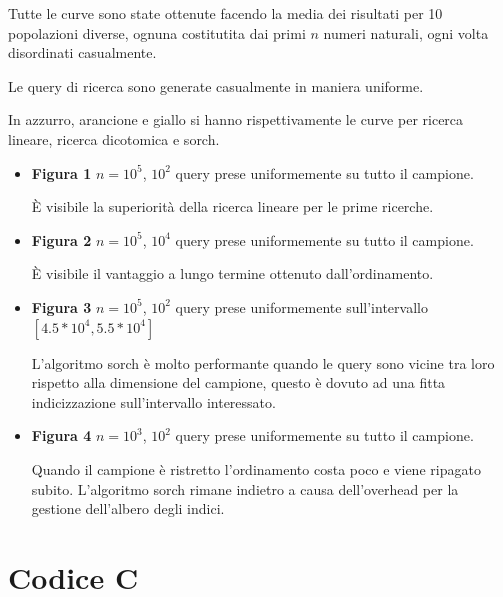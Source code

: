 \documentclass{article}
\begin{document}
    Tutte le curve sono state ottenute facendo la media dei risultati per 10
    popolazioni diverse, ognuna costitutita dai primi $n$ numeri naturali,
    ogni volta disordinati casualmente.

    Le query di ricerca sono generate casualmente in maniera uniforme.

    In azzurro, arancione e giallo si hanno rispettivamente le curve per ricerca
    lineare, ricerca dicotomica e sorch.

    \begin{itemize}
      \item \textbf{Figura 1} $n = 10^5$, $10^2$ query prese uniformemente su
        tutto il campione.

        È visibile la superiorità della ricerca lineare per le prime ricerche.

      \item \textbf{Figura 2} $n = 10^5$, $10^4$ query prese uniformemente su
        tutto il campione.

        È visibile il vantaggio a lungo termine ottenuto dall'ordinamento.

      \item \textbf{Figura 3} $n = 10^5$, $10^2$ query prese uniformemente
        sull'intervallo $[4.5*10^4, 5.5*10^4]$

        L'algoritmo sorch è molto performante quando le query sono vicine tra
        loro rispetto alla dimensione del campione, questo è dovuto ad una fitta
        indicizzazione sull'intervallo interessato.

      \item \textbf{Figura 4} $n = 10^3$, $10^2$ query prese uniformemente su
        tutto il campione.

        Quando il campione è ristretto l'ordinamento costa poco e viene ripagato
        subito. L'algoritmo sorch rimane indietro a causa dell'overhead per la
        gestione dell'albero degli indici.

    \end{itemize}
\section{Codice C}

\pagebreak

\end{document}
